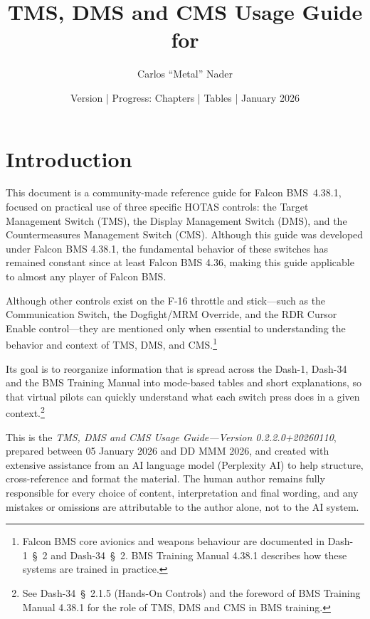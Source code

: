 \documentclass[11pt,a4paper]{article}
\title{TMS, DMS and CMS Usage Guide for \bmsver}
\author{Carlos ``Metal'' Nader}
\date{Version \fulldocversion{} | Progress: Chapters \chapterscompletedof{} | Tables \tablesfilledpct{} | January 2026}
\providecommand{\dashref}[1]{Dash-34~\S~#1}
\providecommand{\dashone}[1]{Dash-1~\S~#1}
\providecommand{\trnman}{BMS Training Manual 4.38.1}
\providecommand{\bmsver}{Falcon BMS~4.38.1}
\newcommand{\docversion}{0.2.2.0}
\newcommand{\docbuild}{20260110}
\newcommand{\docstartdate}{05 January 2026}
\newcommand{\docenddate}{DD MMM 2026}
\newcommand{\fulldocversion}{\docversion+\docbuild}
\begin{document}
\maketitle


\newpage

\tableofcontents

\newpage



\section{Introduction}

This document is a community-made reference guide for \bmsver, focused on practical use of three specific HOTAS controls: the Target Management Switch (TMS), the Display Management Switch (DMS), and the Countermeasures Management Switch (CMS). Although this guide was developed under Falcon BMS 4.38.1, the fundamental behavior of these switches has remained constant since at least Falcon BMS 4.36, making this guide applicable to almost any player of Falcon BMS.

Although other controls exist on the F-16 throttle and stick---such as the Communication Switch, the Dogfight/MRM Override, and the RDR Cursor Enable control---they are mentioned only when essential to understanding the behavior and context of TMS, DMS, and CMS.\footnote{Falcon BMS core avionics and weapons behaviour are documented in \dashone{2} and \dashref{2}. \trnman{} describes how these systems are trained in practice.}

Its goal is to reorganize information that is spread across the Dash-1, Dash-34 and the BMS Training Manual into mode-based tables and short explanations, so that virtual pilots can quickly understand what each switch press does in a given context.\footnote{See \dashref{2.1.5} (Hands-On Controls) and the foreword of \trnman{} for the role of TMS, DMS and CMS in BMS training.}

This is the \emph{TMS, DMS and CMS Usage Guide---Version \fulldocversion}, prepared between \docstartdate{} and \docenddate{}, and created with extensive assistance from an AI language model (Perplexity AI) to help structure, cross-reference and format the material. The human author remains fully responsible for every choice of content, interpretation and final wording, and any mistakes or omissions are attributable to the author alone, not to the AI system.
\end{document}
